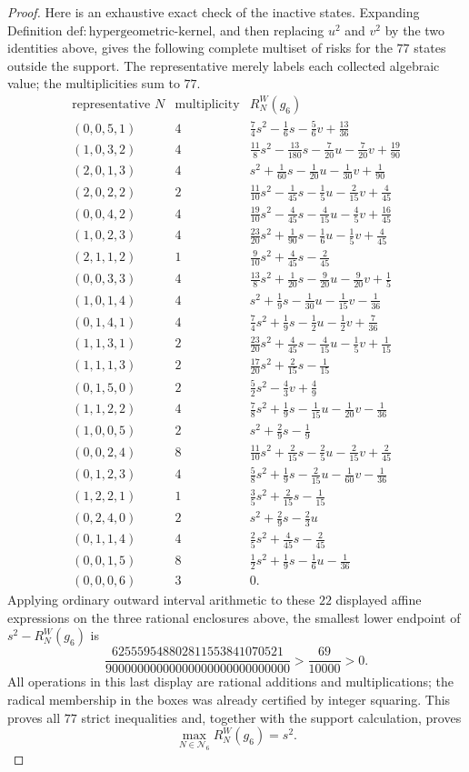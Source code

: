 \documentclass{article}
\begin{document}
\begin{proof}
Here is an exhaustive exact check of the inactive states.  Expanding Definition \(\mathrm{def{:}hypergeometric\mbox{-}kernel}\), and then replacing \(u^2\) and \(v^2\) by the two identities above, gives the following complete multiset of risks for the \(77\) states outside the support.  The representative merely labels each collected algebraic value; the multiplicities sum to \(77\).
\[
\begin{array}{c|r|l}
\text{representative }N&\text{multiplicity}&R_N^W(g_6)\\ \hline
(0,0,5,1)&4&\frac74s^2-\frac16s-\frac56v+\frac{13}{36}\\
(1,0,3,2)&4&\frac{11}{8}s^2-\frac{13}{180}s-\frac7{20}u-\frac7{20}v+\frac{19}{90}\\
(2,0,1,3)&4&s^2+\frac1{60}s-\frac1{20}u-\frac1{30}v+\frac1{90}\\
(2,0,2,2)&2&\frac{11}{10}s^2-\frac1{45}s-\frac15u-\frac2{15}v+\frac4{45}\\
(0,0,4,2)&4&\frac{19}{10}s^2-\frac4{45}s-\frac4{15}u-\frac45v+\frac{16}{45}\\
(1,0,2,3)&4&\frac{23}{20}s^2+\frac1{90}s-\frac16u-\frac15v+\frac4{45}\\
(2,1,1,2)&1&\frac9{10}s^2+\frac4{45}s-\frac2{45}\\
(0,0,3,3)&4&\frac{13}{8}s^2+\frac1{20}s-\frac9{20}u-\frac9{20}v+\frac15\\
(1,0,1,4)&4&s^2+\frac19s-\frac1{30}u-\frac1{15}v-\frac1{36}\\
(0,1,4,1)&4&\frac74s^2+\frac19s-\frac12u-\frac12v+\frac7{36}\\
(1,1,3,1)&2&\frac{23}{20}s^2+\frac4{45}s-\frac4{15}u-\frac15v+\frac1{15}\\
(1,1,1,3)&2&\frac{17}{20}s^2+\frac2{15}s-\frac1{15}\\
(0,1,5,0)&2&\frac52s^2-\frac43v+\frac49\\
(1,1,2,2)&4&\frac78s^2+\frac19s-\frac1{15}u-\frac1{20}v-\frac1{36}\\
(1,0,0,5)&2&s^2+\frac29s-\frac19\\
(0,0,2,4)&8&\frac{11}{10}s^2+\frac2{15}s-\frac25u-\frac2{15}v+\frac2{45}\\
(0,1,2,3)&4&\frac58s^2+\frac19s-\frac2{15}u-\frac1{60}v-\frac1{36}\\
(1,2,2,1)&1&\frac35s^2+\frac2{15}s-\frac1{15}\\
(0,2,4,0)&2&s^2+\frac29s-\frac23u\\
(0,1,1,4)&4&\frac25s^2+\frac4{45}s-\frac2{45}\\
(0,0,1,5)&8&\frac12s^2+\frac19s-\frac16u-\frac1{36}\\
(0,0,0,6)&3&0.
\end{array}
\]
Applying ordinary outward interval arithmetic to these \(22\) displayed affine expressions on the three rational enclosures above, the smallest lower endpoint of \(s^2-R_N^W(g_6)\) is
\[
 \frac{625559548802811553841070521}
 {90000000000000000000000000000}>\frac{69}{10000}>0.
\]
All operations in this last display are rational additions and multiplications; the radical membership in the boxes was already certified by integer squaring.  This proves all \(77\) strict inequalities and, together with the support calculation, proves
\[
 \max_{N\in\mathcal N_6}R_N^W(g_6)=s^2.
\]


\end{proof}
\end{document}
